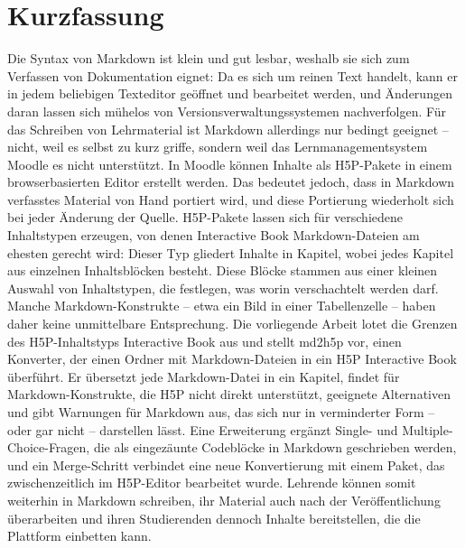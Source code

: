 \section*{Kurzfassung}
\label{sec:kurzfassung}

Die Syntax von Markdown ist klein und gut lesbar, weshalb sie sich zum Verfassen von
Dokumentation eignet: Da es sich um reinen Text handelt, kann er in jedem beliebigen Texteditor geöffnet und
bearbeitet werden, und Änderungen daran lassen sich mühelos von Versionsverwaltungssystemen
nachverfolgen.
Für das Schreiben von Lehrmaterial ist Markdown allerdings nur bedingt geeignet -- nicht, weil es
selbst zu kurz griffe, sondern weil das Lernmanagementsystem Moodle es nicht unterstützt.
In Moodle können Inhalte als H5P-Pakete in einem browserbasierten Editor erstellt werden.
Das bedeutet jedoch, dass in Markdown verfasstes Material von Hand portiert wird, und diese
Portierung wiederholt sich bei jeder Änderung der Quelle.
H5P-Pakete lassen sich für verschiedene Inhaltstypen erzeugen, von denen Interactive Book
Markdown-Dateien am ehesten gerecht wird: Dieser Typ gliedert Inhalte in Kapitel, wobei jedes
Kapitel aus einzelnen Inhaltsblöcken besteht.
Diese Blöcke stammen aus einer kleinen Auswahl von Inhaltstypen, die festlegen, was
worin verschachtelt werden darf.
Manche Markdown-Konstrukte -- etwa ein
Bild in einer Tabellenzelle -- haben daher keine unmittelbare Entsprechung.
Die vorliegende Arbeit lotet die Grenzen des H5P-Inhaltstyps Interactive Book aus und stellt
md2h5p vor, einen Konverter, der einen Ordner mit Markdown-Dateien in ein H5P Interactive
Book überführt.
Er übersetzt jede Markdown-Datei in ein Kapitel, findet für Markdown-Konstrukte, die H5P nicht
direkt unterstützt, geeignete Alternativen und gibt Warnungen für Markdown aus, das sich nur in
verminderter Form -- oder gar nicht -- darstellen lässt.
Eine Erweiterung ergänzt Single- und Multiple-Choice-Fragen, die als eingezäunte Codeblöcke in
Markdown geschrieben werden, und ein Merge-Schritt verbindet eine neue Konvertierung mit einem
Paket, das zwischenzeitlich im H5P-Editor bearbeitet wurde.
Lehrende können somit weiterhin in Markdown schreiben, ihr Material auch nach der Veröffentlichung
überarbeiten und ihren Studierenden dennoch Inhalte bereitstellen, die die Plattform einbetten kann.

